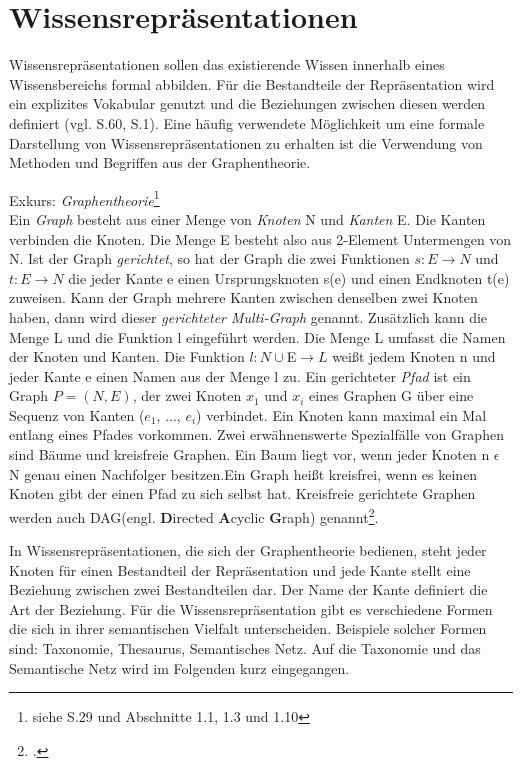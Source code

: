 \section{Wissensrepräsentationen}
\label{Ch:ErstProz:Sec:Wissensrepräsentaionen}
Wissensrepräsentationen sollen das existierende Wissen innerhalb eines Wissensbereichs formal abbilden. Für die Bestandteile der Repräsentation wird ein explizites Vokabular genutzt und die Beziehungen zwischen diesen werden definiert (vgl. \cite{BEN16} S.60, \cite{SEB04} S.1). Eine häufig verwendete Möglichkeit um eine formale Darstellung von Wissensrepräsentationen zu erhalten ist die Verwendung von Methoden und Begriffen aus der Graphentheorie.

Exkurs: \textit{Graphentheorie}\footnote{siehe \cite{STU09} S.29 und \cite{DIE20} Abschnitte 1.1, 1.3 und 1.10}\\
Ein \textit{Graph} besteht aus einer Menge von \textit{Knoten} N und \textit{Kanten} E. Die Kanten verbinden die Knoten. Die Menge E besteht also aus 2-Element Untermengen von N. Ist der Graph \textit{gerichtet}, so hat der Graph die zwei Funktionen $s:E\rightarrow N$ und $t:E\rightarrow N$ die jeder Kante e einen Ursprungsknoten s(e) und einen Endknoten t(e) zuweisen. Kann der Graph mehrere Kanten zwischen denselben zwei Knoten haben, dann wird dieser \textit{gerichteter Multi-Graph} genannt. Zusätzlich kann die Menge L und die Funktion l eingeführt werden. Die Menge L umfasst die Namen der Knoten und Kanten. Die Funktion $l:N\cup$E$\rightarrow L$ weißt jedem Knoten n und jeder Kante e einen Namen aus der Menge l zu.
Ein gerichteter \textit{Pfad} ist ein Graph $P = (N, E)$, der zwei Knoten $x_1$ und $x_i$ eines Graphen G über eine Sequenz von Kanten ($e_1$, $\dots$, $e_i$) verbindet. Ein Knoten kann maximal ein Mal entlang eines Pfades vorkommen. 
Zwei erwähnenswerte Spezialfälle von Graphen sind Bäume und kreisfreie Graphen. Ein Baum liegt vor, wenn jeder Knoten n $\epsilon$ N genau einen Nachfolger besitzen.\glqq Ein Graph heißt kreisfrei, wenn es keinen Knoten gibt der einen Pfad zu sich selbst hat. Kreisfreie gerichtete Graphen werden auch DAG(engl. \textbf{D}irected \textbf{A}cyclic \textbf{G}raph) genannt\grqq\footcite{STU09}. 

In Wissensrepräsentationen, die sich der Graphentheorie bedienen, steht jeder Knoten für einen Bestandteil der Repräsentation und jede Kante stellt eine Beziehung zwischen zwei Bestandteilen dar. Der Name der Kante definiert die Art der Beziehung. Für die Wissensrepräsentation gibt es verschiedene Formen die sich in ihrer semantischen Vielfalt unterscheiden. Beispiele solcher Formen sind: Taxonomie, Thesaurus, Semantisches Netz. Auf die Taxonomie und das Semantische Netz wird im Folgenden kurz eingegangen.
 

